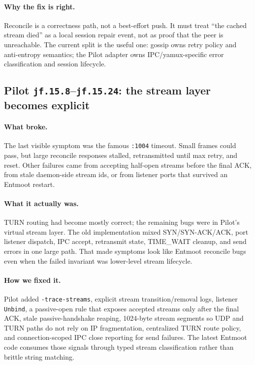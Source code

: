 \documentclass[11pt,a4paper]{article}
\begin{document}
\paragraph{Why the fix is right.} Reconcile is a correctness path, not
a best-effort push. It must treat ``the cached stream died'' as a local
session repair event, not as proof that the peer is unreachable. The
current split is the useful one: gossip owns retry policy and
anti-entropy semantics; the Pilot adapter owns IPC/yamux-specific error
classification and session lifecycle.

\subsection{Pilot \texttt{jf.15.8}--\texttt{jf.15.24}: the stream
layer becomes explicit}

\paragraph{What broke.} The last visible symptom was the famous
\texttt{:1004} timeout. Small frames could pass, but large reconcile
responses stalled, retransmitted until max retry, and reset. Other
failures came from accepting half-open streams before the final ACK,
from stale daemon-side stream ids, or from listener ports that survived
an Entmoot restart.

\paragraph{What it actually was.} TURN routing had become mostly
correct; the remaining bugs were in Pilot's virtual stream layer. The
old implementation mixed SYN/SYN-ACK/ACK, port listener dispatch, IPC
accept, retransmit state, TIME\_WAIT cleanup, and send errors in one
large path. That made symptoms look like Entmoot reconcile bugs even
when the failed invariant was lower-level stream lifecycle.

\paragraph{How we fixed it.} Pilot added \texttt{-trace-streams},
explicit stream transition/removal logs, listener \texttt{Unbind}, a
passive-open rule that exposes accepted streams only after the final
ACK, stale passive-handshake reaping, 1024-byte stream segments so UDP
and TURN paths do not rely on IP fragmentation, centralized TURN route
policy, and connection-scoped IPC close reporting for send failures.
The latest Entmoot code consumes those signals through typed stream
classification rather than brittle string matching.
\end{document}
